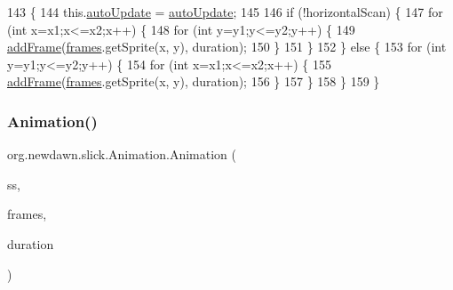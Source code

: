 \begin{DoxyCode}
143                                                                                                            
                              \{
144         this.\mbox{\hyperlink{classorg_1_1newdawn_1_1slick_1_1_animation_a343dbff14a050cf8753e9a67746deede}{autoUpdate}} = \mbox{\hyperlink{classorg_1_1newdawn_1_1slick_1_1_animation_a343dbff14a050cf8753e9a67746deede}{autoUpdate}};
145         
146         \textcolor{keywordflow}{if} (!horizontalScan) \{
147             \textcolor{keywordflow}{for} (\textcolor{keywordtype}{int} x=x1;x<=x2;x++) \{
148                 \textcolor{keywordflow}{for} (\textcolor{keywordtype}{int} y=y1;y<=y2;y++) \{
149                     \mbox{\hyperlink{classorg_1_1newdawn_1_1slick_1_1_animation_ae96843e67072ef3b085072cb0840a8ba}{addFrame}}(\mbox{\hyperlink{classorg_1_1newdawn_1_1slick_1_1_animation_a39f0c6a16e479985b22f7dd3bb781bf7}{frames}}.getSprite(x, y), duration);
150                 \}
151             \}
152         \} \textcolor{keywordflow}{else} \{
153             \textcolor{keywordflow}{for} (\textcolor{keywordtype}{int} y=y1;y<=y2;y++) \{
154                 \textcolor{keywordflow}{for} (\textcolor{keywordtype}{int} x=x1;x<=x2;x++) \{
155                     \mbox{\hyperlink{classorg_1_1newdawn_1_1slick_1_1_animation_ae96843e67072ef3b085072cb0840a8ba}{addFrame}}(\mbox{\hyperlink{classorg_1_1newdawn_1_1slick_1_1_animation_a39f0c6a16e479985b22f7dd3bb781bf7}{frames}}.getSprite(x, y), duration);
156                 \}
157             \}
158         \}
159     \}
\end{DoxyCode}
\mbox{\label{classorg_1_1newdawn_1_1slick_1_1_animation_a1c523b4565c8f280afb975c754b817cf}} 
\subsubsection{\texorpdfstring{Animation()}{Animation()}\hspace{0.1cm}{\footnotesize\ttfamily [9/9]}}
{\footnotesize\ttfamily org.\+newdawn.\+slick.\+Animation.\+Animation (\begin{DoxyParamCaption}\item[{\mbox{\hyperlink{classorg_1_1newdawn_1_1slick_1_1_sprite_sheet}{Sprite\+Sheet}}}]{ss,  }\item[{int \mbox{[}$\,$\mbox{]}}]{frames,  }\item[{int \mbox{[}$\,$\mbox{]}}]{duration }\end{DoxyParamCaption})\hspace{0.3cm}{\ttfamily [inline]}}

